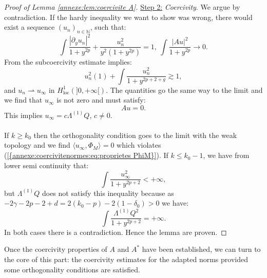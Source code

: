 \documentclass[11pt,a4paper,reqno]{amsart}
\theoremstyle{remark}
\numberwithin{equation}{section}
\begin{document}
\begin{appendix}
\begin{proof}[Proof of Lemma \ref{annexe:lem:coercivite A}]
\underline{Step 2:} \emph{Coercivity}. We argue by contradiction. If the hardy inequality we want to show was wrong, there would exist a sequence $(u_n)_{n\in \mathbb{N}}$, such that:
$$
\int \frac{|\partial_y u_n|^2}{1+y^{2p}}+\frac{u_n^2}{y^2(1+y^{2p})}=1, \ \int \frac{|Au|^2}{1+y^{2p}}\rightarrow 0 .
$$
From the subcoercivity estimate implies:
$$
u_n^2(1)+\int \frac{u_n^2}{1+y^{2p+2+g}}\gtrsim 1 ,
$$
and $u_{n}\rightharpoonup u_{\infty}$ in $H^1_{\text{loc}}(]0,+\infty[)$. The quantities go the same way to the limit and we find that $u_{\infty}$ is not zero and must satisfy:
$$
Au=0 .
$$
This implies $u_{\infty}=c\Lambda^{(1)} Q$, $c\neq 0$.\\
\\
If $k\geq k_0$ then the orthogonality condition goes to the limit with the weak topology and we find $\langle u_{\infty}, \Phi_M\rangle =0$ which violates {{\rm (\ref{{annexe:coercivitenormes:eq:proprietes PhiM}})}}. If $k\leq k_0-1$, we have from lower semi continuity that:
$$
\int \frac{u_{\infty}^2}{1+y^{2p+2}}<+\infty ,
$$
but $\Lambda^{(1)}Q$ does not satisfy this inequality because as $-2\gamma-2p-2+d=2(k_0-p)-2(1-\delta_0)>0$ we have:
$$
\int \frac{\Lambda^{(1)}Q^2}{1+y^{2p+2}}=+\infty .
$$
In both cases there is a contradiction. Hence the lemma are proven.
\end{proof}

Once the coercivity properties of $A$ and $A^*$ have been established, we can turn to the core of this part: the coercivity estimates for the adapted norms provided some orthogonality conditions are satisfied.


\end{appendix}
\end{document}
